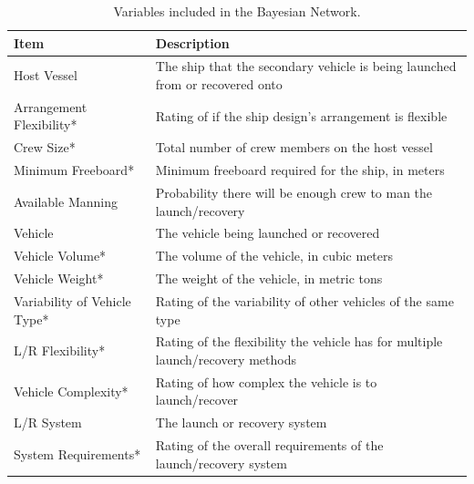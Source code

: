 \documentclass{svproc}
\begin{document}
\begin{table}[htb]
\begin{center}
\setlength\extrarowheight{3.5pt}
\caption{Variables included in the Bayesian Network.}
\begin{tabular}{p{3.5cm}  p{8.7cm}}
\hline
Item                          & Description                                                                        \\
\hline
\hline 
Host Vessel                   & The ship that the secondary vehicle is being launched from or recovered onto       \\
Arrangement \linebreak Flexibility*      & Rating of if the ship design's arrangement is flexible                             \\
Crew Size*                     & Total number of crew members on the host vessel                                    \\
Minimum Freeboard*             & Minimum freeboard required for the ship, in meters                                  \\
Available Manning             & Probability there will be enough crew to man the launch/recovery                   \\
\hline
Vehicle                       & The vehicle being launched or recovered                                            \\
Vehicle Volume*                & The volume of the vehicle, in cubic meters                                         \\
Vehicle Weight*                & The weight of the vehicle, in metric tons                                          \\
Variability \linebreak of Vehicle Type*   & Rating of the variability of other vehicles of the same type                       \\
L/R Flexibility*               & Rating of the flexibility the vehicle has for multiple launch/recovery methods     \\
Vehicle Complexity*            & Rating of how complex the vehicle is to launch/recover                             \\
\hline
L/R System                    & The launch or recovery system                                                      \\
System \linebreak Requirements*           & Rating of the overall requirements of the launch/recovery \linebreak system                   \\

\end{tabular}
\end{center}
\end{table}
\end{document}
